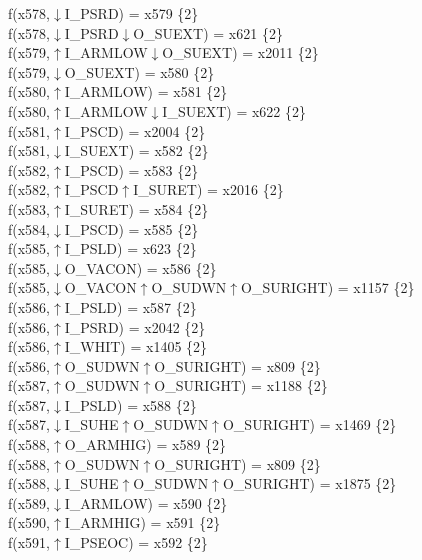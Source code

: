 f(x578,$\downarrow$I\_PSRD) = x579 \{2\} \\  
f(x578,$\downarrow$I\_PSRD$\downarrow$O\_SUEXT) = x621 \{2\} \\  
f(x579,$\uparrow$I\_ARMLOW$\downarrow$O\_SUEXT) = x2011 \{2\} \\  
f(x579,$\downarrow$O\_SUEXT) = x580 \{2\} \\  
f(x580,$\uparrow$I\_ARMLOW) = x581 \{2\} \\  
f(x580,$\uparrow$I\_ARMLOW$\downarrow$I\_SUEXT) = x622 \{2\} \\  
f(x581,$\uparrow$I\_PSCD) = x2004 \{2\} \\  
f(x581,$\downarrow$I\_SUEXT) = x582 \{2\} \\  
f(x582,$\uparrow$I\_PSCD) = x583 \{2\} \\  
f(x582,$\uparrow$I\_PSCD$\uparrow$I\_SURET) = x2016 \{2\} \\  
f(x583,$\uparrow$I\_SURET) = x584 \{2\} \\  
f(x584,$\downarrow$I\_PSCD) = x585 \{2\} \\  
f(x585,$\uparrow$I\_PSLD) = x623 \{2\} \\  
f(x585,$\downarrow$O\_VACON) = x586 \{2\} \\  
f(x585,$\downarrow$O\_VACON$\uparrow$O\_SUDWN$\uparrow$O\_SURIGHT) = x1157 \{2\} \\  
f(x586,$\uparrow$I\_PSLD) = x587 \{2\} \\  
f(x586,$\uparrow$I\_PSRD) = x2042 \{2\} \\  
f(x586,$\uparrow$I\_WHIT) = x1405 \{2\} \\  
f(x586,$\uparrow$O\_SUDWN$\uparrow$O\_SURIGHT) = x809 \{2\} \\  
f(x587,$\uparrow$O\_SUDWN$\uparrow$O\_SURIGHT) = x1188 \{2\} \\  
f(x587,$\downarrow$I\_PSLD) = x588 \{2\} \\  
f(x587,$\downarrow$I\_SUHE$\uparrow$O\_SUDWN$\uparrow$O\_SURIGHT) = x1469 \{2\} \\  
f(x588,$\uparrow$O\_ARMHIG) = x589 \{2\} \\  
f(x588,$\uparrow$O\_SUDWN$\uparrow$O\_SURIGHT) = x809 \{2\} \\  
f(x588,$\downarrow$I\_SUHE$\uparrow$O\_SUDWN$\uparrow$O\_SURIGHT) = x1875 \{2\} \\  
f(x589,$\downarrow$I\_ARMLOW) = x590 \{2\} \\  
f(x590,$\uparrow$I\_ARMHIG) = x591 \{2\} \\  
f(x591,$\uparrow$I\_PSEOC) = x592 \{2\} \\  
